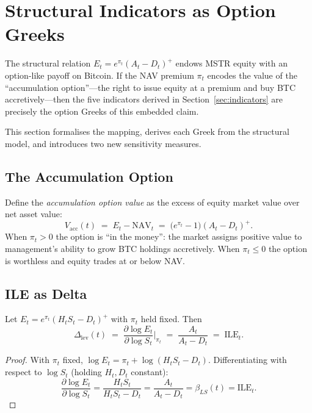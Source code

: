 \section{Structural Indicators as Option Greeks}\label{sec:greeks}

The structural relation $E_t = e^{\pi_t}(A_t - D_t)^+$ endows MSTR equity with an
option-like payoff on Bitcoin.  If the NAV premium $\pi_t$ encodes the value of the
``accumulation option''---the right to issue equity at a premium and buy BTC
accretively---then the five indicators derived in Section~\ref{sec:indicators}
are precisely the option Greeks of this embedded claim.

This section formalises the mapping, derives each Greek from the structural model,
and introduces two new sensitivity measures.

\subsection{The Accumulation Option}

\begin{definition}\label{def:acc-option}
Define the \emph{accumulation option value} as the excess of equity market value
over net asset value:
$$
  V_{\mathrm{acc}}(t) \;=\; E_t - \mathrm{NAV}_t
  \;=\; \bigl(e^{\pi_t} - 1\bigr)(A_t - D_t)^+.
$$
When $\pi_t > 0$ the option is ``in the money'': the market assigns positive
value to management's ability to grow BTC holdings accretively.
When $\pi_t \le 0$ the option is worthless and equity trades at or below NAV.
\end{definition}

\subsection{ILE as Delta}\label{ssec:ile-delta}

\begin{proposition}\label{prop:ile-delta}
Let $E_t = e^{\pi_t}(H_t S_t - D_t)^+$ with $\pi_t$ held fixed.  Then
$$
  \Delta_{\mathrm{lev}}(t)
  \;=\;
  \frac{\partial \log E_t}{\partial \log S_t}\bigg|_{\pi_t}
  \;=\;
  \frac{A_t}{A_t - D_t}
  \;=\;
  \mathrm{ILE}_t.
$$
\end{proposition}

\begin{proof}
With $\pi_t$ fixed, $\log E_t = \pi_t + \log(H_t S_t - D_t)$.  Differentiating
with respect to $\log S_t$ (holding $H_t, D_t$ constant):
$$
  \frac{\partial \log E_t}{\partial \log S_t}
  = \frac{H_t S_t}{H_t S_t - D_t}
  = \frac{A_t}{A_t - D_t}
  = \beta_{LS}(t)
  = \mathrm{ILE}_t.
$$
\end{proof}

